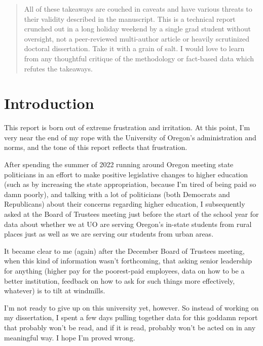 \documentclass[10pt]{article}
\begin{document}
\begin{abstract}
All of these takeaways are couched in caveats and have various threats to their validity described in the manuscript. This is a technical report crunched out in a long holiday weekend by a single grad student without oversight, not a peer-reviewed multi-author article or heavily scrutinized doctoral dissertation. Take it with a grain of salt. I would love to learn from any thoughtful critique of the methodology or fact-based data which refutes the takeaways.
\end{abstract}


\section{Introduction}

This report is born out of extreme frustration and irritation. At this point, I'm very near the end of my rope with the University of Oregon's administration and norms, and the tone of this report reflects that frustration.

After spending the summer of 2022 running around Oregon meeting state politicians in an effort to make positive legislative changes to higher education (such as by increasing the state appropriation, because I'm tired of being paid so damn poorly), and talking with a lot of politicians (both Democrats and Republicans) about their concerns regarding higher education, I subsequently asked at the Board of Trustees meeting just before the start of the school year for data about whether we at UO are serving Oregon's in-state students from rural places just as well as we are serving our students from urban areas.

It became clear to me (again) after the December Board of Trustees meeting, when this kind of information wasn't forthcoming, that asking senior leadership for anything (higher pay for the poorest-paid employees, data on how to be a better institution, feedback on how to ask for such things more effectively, whatever) is to tilt at windmills.

I'm not ready to give up on this university yet, however. So instead of working on my dissertation, I spent a few days pulling together data for this goddamn report that probably won't be read, and if it is read, probably won't be acted on in any meaningful way. I hope I'm proved wrong.
\end{document}
